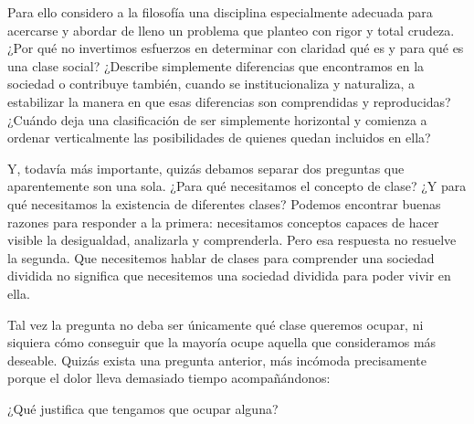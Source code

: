 \documentclass[12pt,a4paper]{article}
\begin{document}
Para ello considero a la filosofía una disciplina especialmente adecuada para acercarse y abordar de lleno un problema que planteo con rigor y total crudeza. ¿Por qué no invertimos esfuerzos en determinar con claridad qué es y para qué es una clase social? ¿Describe simplemente diferencias que encontramos en la sociedad o contribuye también, cuando se institucionaliza y naturaliza, a estabilizar la manera en que esas diferencias son comprendidas y reproducidas? ¿Cuándo deja una clasificación de ser simplemente horizontal y comienza a ordenar verticalmente las posibilidades de quienes quedan incluidos en ella?

Y, todavía más importante, quizás debamos separar dos preguntas que aparentemente son una sola. ¿Para qué necesitamos el concepto de clase? ¿Y para qué necesitamos la existencia de diferentes clases? Podemos encontrar buenas razones para responder a la primera: necesitamos conceptos capaces de hacer visible la desigualdad, analizarla y comprenderla. Pero esa respuesta no resuelve la segunda. Que necesitemos hablar de clases para comprender una sociedad dividida no significa que necesitemos una sociedad dividida para poder vivir en ella.

Tal vez la pregunta no deba ser únicamente qué clase queremos ocupar, ni siquiera cómo conseguir que la mayoría ocupe aquella que consideramos más deseable. Quizás exista una pregunta anterior, más incómoda precisamente porque el dolor lleva demasiado tiempo acompañándonos:

¿Qué justifica que tengamos que ocupar alguna?
\end{document}
